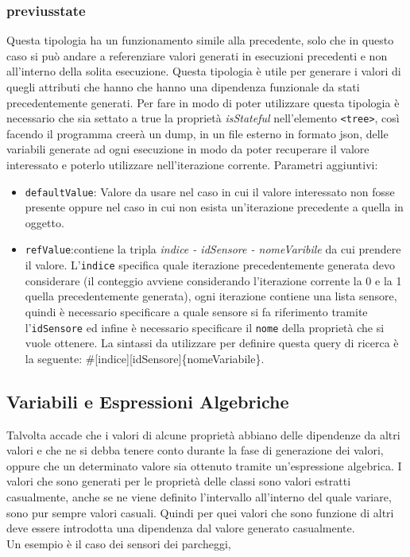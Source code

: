 \documentclass[12pt,a4paper,italian]{article}
\begin{document}
\subsubsection{\large{previusstate}} Questa tipologia ha un funzionamento simile alla precedente, solo che in questo caso si può andare a referenziare valori generati in esecuzioni precedenti e non all'interno della solita esecuzione.
Questa tipologia è utile per generare i valori di quegli attributi che hanno che hanno una dipendenza funzionale da stati precedentemente generati. Per fare in modo di poter utilizzare questa tipologia è necessario che sia settato a true la proprietà 
\emph{isStateful} nell'elemento \texttt{<tree>}, così facendo il programma creerà un dump, in un file esterno in formato json, delle variabili generate ad ogni esecuzione in modo da poter recuperare il valore interessato e poterlo
utilizzare nell'iterazione corrente.
Parametri aggiuntivi:\\
\begin{itemize}
	\item \texttt{defaultValue}: Valore da usare nel caso in cui il valore interessato non fosse presente oppure nel caso in cui non esista un'iterazione precedente a quella in oggetto.
	\item \texttt{refValue}:contiene la tripla \emph{indice - idSensore - nomeVaribile} da cui prendere il valore. L'\texttt{indice} specifica quale iterazione precedentemente generata devo considerare (il conteggio avviene considerando l'iterazione corrente la 0 e la 1 quella precedentemente generata),
ogni iterazione contiene una lista sensore, quindi è necessario specificare a quale sensore si fa riferimento tramite l'\texttt{idSensore} ed infine è necessario specificare il \texttt{nome} della proprietà che si vuole ottenere.
La sintassi da utilizzare per definire questa query di ricerca è la seguente: \#[indice][idSensore]\{nomeVariabile\}.\\
	\end{itemize}
	
\subsection{Variabili e Espressioni Algebriche}
Talvolta accade che i valori di alcune proprietà abbiano delle dipendenze da altri valori e che ne si debba tenere conto durante la fase di generazione dei valori, oppure che un 
determinato valore sia ottenuto tramite un'espressione algebrica.
I valori che sono generati per le proprietà delle classi sono valori estratti casualmente, anche se ne viene definito l'intervallo all'interno del quale variare, sono pur sempre valori casuali. 
Quindi per quei valori che sono funzione di altri deve essere introdotta una dipendenza dal valore generato casualmente.\\
Un esempio è il caso dei sensori dei parcheggi, 
\end{document}
